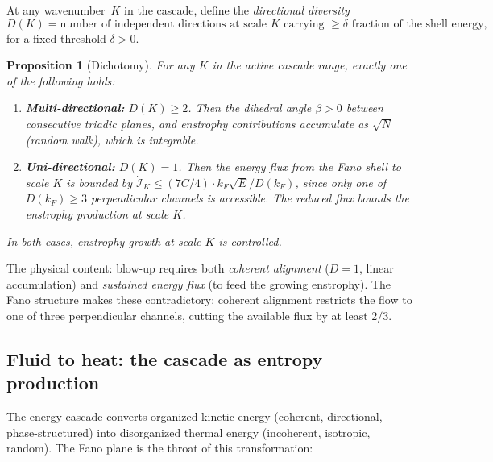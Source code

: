 \documentclass[11pt]{article}
\newtheorem{proposition}[theorem]{Proposition}
\theoremstyle{definition}
\theoremstyle{remark}
\begin{document}
At any wavenumber~$K$ in the cascade, define the
\emph{directional diversity}
\[
  D(K) = \text{number of independent directions at scale } K
  \text{ carrying } \geq \delta \text{ fraction of the shell energy},
\]
for a fixed threshold $\delta > 0$.

\begin{proposition}[Dichotomy]\label{prop:dichotomy}
For any $K$ in the active cascade range, exactly one
of the following holds:
\begin{enumerate}
  \item[\textup{(A)}] \textbf{Multi-directional:}
    $D(K) \geq 2$. Then the dihedral angle $\beta > 0$
    between consecutive triadic planes, and enstrophy
    contributions accumulate as $\sqrt{N}$ (random walk),
    which is integrable.
  \item[\textup{(B)}] \textbf{Uni-directional:}
    $D(K) = 1$. Then the energy flux from the Fano shell
    to scale $K$ is bounded by
    $\dot{\mathcal{I}}_K \leq (7C/4) \cdot k_F \sqrt{E} / D(k_F)$,
    since only one of $D(k_F) \geq 3$ perpendicular channels
    is accessible. The reduced flux bounds the enstrophy
    production at scale $K$.
\end{enumerate}
In both cases, enstrophy growth at scale $K$ is controlled.
\end{proposition}

The physical content: blow-up requires both
\emph{coherent alignment} ($D = 1$, linear accumulation)
and \emph{sustained energy flux} (to feed the growing enstrophy).
The Fano structure makes these contradictory:
coherent alignment restricts the flow to one of three
perpendicular channels, cutting the available flux by
at least $2/3$.

\subsection{Fluid to heat: the cascade as entropy production}

The energy cascade converts organized kinetic energy
(coherent, directional, phase-structured) into
disorganized thermal energy (incoherent, isotropic, random).
The Fano plane is the throat of this transformation:
\end{document}

